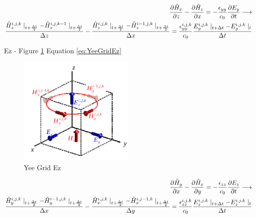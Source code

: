 \documentclass[a4paper,10pt]{article}
\begin{document}
\begin{align}
  \label{eq:YeeGridEy}
  \frac{\partial \tilde{H}_x}{\partial z} - \frac{\partial \tilde{H}_z}{\partial x} = -\frac{\epsilon_{yy}}{c_0}\frac{\partial E_y}{\partial t}
  \longrightarrow\\
  \frac{\tilde{H}_{x}^{i,j,k}\mid_{t+\frac{\Delta t}{2}} - \tilde{H}_{x}^{i,j,k-1}\mid_{t+\frac  {\Delta t}{2}}}{\Delta z} - \frac{\tilde{H}_{z}^{i,j,k}\mid_{t+\frac  {\Delta t}{2}} - \tilde{H}_{z}^{i-1,j,k}\mid_{t+\frac  {\Delta t}{2}}}{\Delta x} = \frac{\epsilon_{yy}^{i,j,k}}{c_0} \frac{E_{y}^{i,j,k}\mid_{t+\Delta t} - E_{y}^{i,j,k}\mid_{t}}{\Delta t}\notag
\end{align}


Ez - Figure \ref{fig:YeeGridEz} Equation \eqref{eq:YeeGridEz} 

\begin{figure}[h]
  \centering
    \includegraphics[width=0.5\textwidth]{YeeGridEz.png}
  \caption{Yee Grid Ez}
  \label{fig:YeeGridEz}
\end{figure}

\begin{align}
  \label{eq:YeeGridEz}
  \frac{\partial \tilde{H}_y}{\partial x} - \frac{\partial \tilde{H}_x}{\partial y} = -\frac{\epsilon_{zz}}{c_0}\frac{\partial E_z}{\partial t}
  \longrightarrow\\
  \frac{\tilde{H}_{y}^{i,j,k}\mid_{t+\frac{\Delta t}{2}} - \tilde{H}_{y}^{i-1,j,k}\mid_{t+\frac  {\Delta t}{2}}}{\Delta x} - \frac{\tilde{H}_{x}^{i,j,k}\mid_{t+\frac  {\Delta t}{2}} - \tilde{H}_{x}^{i,j-1,k}\mid_{t+\frac  {\Delta t}{2}}}{\Delta y} = \frac{\epsilon_{zz}^{i,j,k}}{c_0} \frac{E_{z}^{i,j,k}\mid_{t+\Delta t} - E_{z}^{i,j,k}\mid_{t}}{\Delta t}\notag
\end{align}
\end{document}
